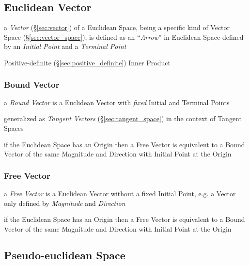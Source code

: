 \subsection{Euclidean Vector}\label{sec:euclidean_vector}

a \emph{Vector} (\S\ref{sec:vector}) of a Euclidean Space, being a specific
kind of Vector Space (\S\ref{sec:vector_space}), is defined as an
``\emph{Arrow}'' in Euclidean Space defined by an \emph{Initial Point} and a
\emph{Terminal Point}

Positive-definite (\S\ref{sec:positive_definite}) Inner Product



\subsubsection{Bound Vector}\label{sec:bound_vector}

a \emph{Bound Vector} is a Euclidean Vector with \emph{fixed} Initial and
Terminal Points

generalized as \emph{Tangent Vectors} (\S\ref{sec:tangent_space}) in the
context of Tangent Spaces

if the Euclidean Space has an Origin then a Free Vector is equivalent to a
Bound Vector of the same Magnitude and Direction with Initial Point at the
Origin



\subsubsection{Free Vector}\label{sec:free_vector}

a \emph{Free Vector} is a Euclidean Vector without a fixed Initial Point, e.g.
a Vector only defined by \emph{Magnitude} and \emph{Direction}

if the Euclidean Space has an Origin then a Free Vector is equivalent to a
Bound Vector of the same Magnitude and Direction with Initial Point at the
Origin



\subsection{Pseudo-euclidean Space}\label{sec:pseudo_euclidean}

